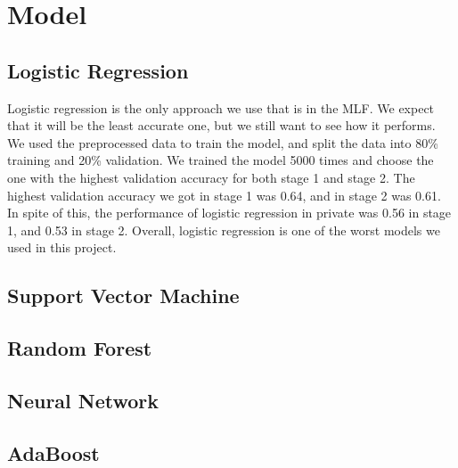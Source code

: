 \documentclass[12pt,a4paper]{article}
\begin{document}
\section{Model}

\subsection{Logistic Regression}

Logistic regression is the only approach we use that is in the MLF. We expect that it will be the least accurate one, but we still want to see how it performs. We used the preprocessed data to train the model, and split the data into 80\% training and 20\% validation. We trained the model 5000 times and choose the one with the highest validation accuracy for both stage 1 and stage 2. The highest validation accuracy we got in stage 1 was 0.64, and in stage 2 was 0.61. In spite of this, the performance of logistic regression in private was 0.56 in stage 1, and 0.53 in stage 2. Overall, logistic regression is one of the worst models we used in this project.

\subsection{Support Vector Machine}

\subsection{Random Forest}

\subsection{Neural Network}

\subsection{AdaBoost}
\end{document}
